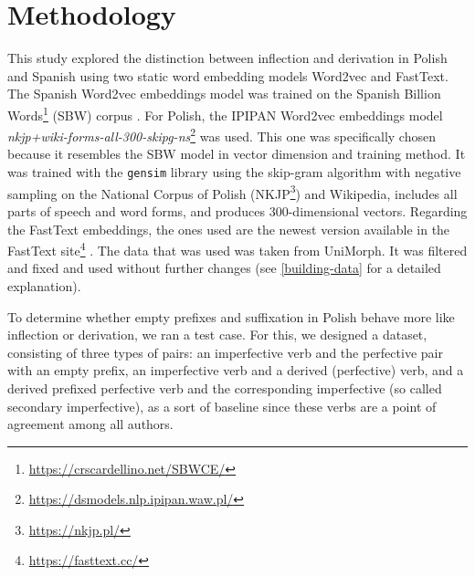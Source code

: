 \documentclass[12pt]{article}
\newcommand{\ts}[1]{\textsuperscript{#1}}
\begin{document}




\section{Methodology} \label{methodology}

This study explored the distinction between inflection and derivation in Polish and Spanish using two static word embedding models Word2vec and FastText. The Spanish Word2vec embeddings model was trained on the Spanish Billion Words\footnote{\url{https://crscardellino.net/SBWCE/}} (SBW) corpus \parencite{cardellino2016SpanishBillionWord}. For Polish, the IPIPAN Word2vec embeddings model \textit{nkjp+wiki-forms-all-300-skipg-ns}\footnote{\url{https://dsmodels.nlp.ipipan.waw.pl/}} was used. This one was specifically chosen because it resembles the SBW model in vector dimension and training method. It was trained with the \texttt{gensim} library using the skip-gram algorithm with negative sampling on the National Corpus of Polish (NKJP\footnote{\url{https://nkjp.pl/}}) and Wikipedia, includes all parts of speech and word forms, and produces 300-dimensional vectors. Regarding the FastText embeddings, the ones used are the newest version available in the FastText site\footnote{\url{https://fasttext.cc/}} \parencite{grave2018LearningWordVectors}. The data that was used was taken from UniMorph. It was filtered and fixed and used without further changes (see \autoref{building-data} for a detailed explanation).

To determine whether empty prefixes and suffixation in Polish behave more like inflection or derivation, we ran a test case. For this, we designed a dataset, consisting of three types of pairs: an imperfective verb and the perfective pair with an empty prefix, an imperfective verb and a derived (perfective) verb, and a derived prefixed perfective verb and the corresponding imperfective (so called secondary imperfective), as a sort of baseline since these verbs are a point of agreement among all authors.
\end{document}
